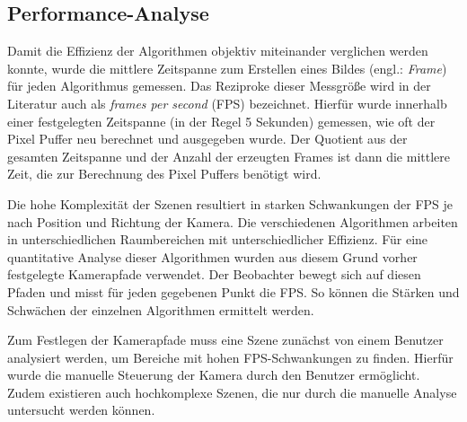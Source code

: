 \documentclass[crop=false]{standalone}
\begin{document}
    \subsection{Performance-Analyse} %
    \label{ssub:performance_analyse}
      Damit die Effizienz der Algorithmen objektiv miteinander verglichen werden konnte, wurde die mittlere Zeitspanne zum Erstellen eines Bildes (engl.: \textit{Frame}) für jeden Algorithmus gemessen.
      Das Reziproke dieser Messgröße wird in der Literatur auch als \textit{frames per second} (FPS) bezeichnet.
      Hierfür wurde innerhalb einer festgelegten Zeitspanne (in der Regel 5 Sekunden) gemessen, wie oft der Pixel Puffer neu berechnet und ausgegeben wurde.
      Der Quotient aus der gesamten Zeitspanne und der Anzahl der erzeugten Frames ist dann die mittlere Zeit, die zur Berechnung des Pixel Puffers benötigt wird.

      Die hohe Komplexität der Szenen resultiert in starken Schwankungen der FPS je nach Position und Richtung der Kamera.
      Die verschiedenen Algorithmen arbeiten in unterschiedlichen Raumbereichen mit unterschiedlicher Effizienz.
      Für eine quantitative Analyse dieser Algorithmen wurden aus diesem Grund vorher festgelegte Kamerapfade verwendet.
      Der Beobachter bewegt sich auf diesen Pfaden und misst für jeden gegebenen Punkt die FPS.
      So können die Stärken und Schwächen der einzelnen Algorithmen ermittelt werden.

      Zum Festlegen der Kamerapfade muss eine Szene zunächst von einem Benutzer analysiert werden, um Bereiche mit hohen FPS-Schwankungen zu finden.
      Hierfür wurde die manuelle Steuerung der Kamera durch den Benutzer ermöglicht.
      Zudem existieren auch hochkomplexe Szenen, die nur durch die manuelle Analyse untersucht werden können.
\end{document}
